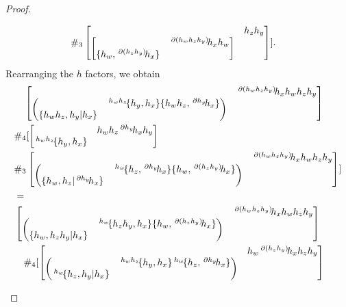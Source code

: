 \documentclass[11pt, reqno]{amsart} %
\newcommand{\act}[1]{\,\sp{#1}\!}
\theoremstyle{definition}
\theoremstyle{remark}
\numberwithin{equation}{section}
\begin{document}
\begin{proof}
\begin{enumerate}
\begin{align*}
      & \#_3
      \begin{bmatrix}& h_zh_y\\ \begin{bmatrix} & \act{\partial (h_wh_zh_y)}h_xh_w\\ \{h_w,\act{\partial (h_zh_y)}h_x\} &\end{bmatrix}&\end{bmatrix}
    ].
  \end{align*}
  Rearranging the $h$ factors, we obtain
  \begin{align*}
    &\quad 
    \begin{bmatrix}& \act{\partial(h_wh_zh_y)}h_xh_wh_zh_y\\ \begin{pmatrix}& \act{h_wh_z}\{h_y,h_x\}\{h_wh_z,\act{\partial h_y}h_x\}\\ \{h_wh_z,h_y|h_x\}& \end{pmatrix}& \end{bmatrix}
    \\
    & \#_4
    [
      \begin{bmatrix}& h_wh_z\act{\partial h_y}h_xh_y\\ \act{h_wh_z}\{h_y,h_x\}&\end{bmatrix} \\
      & 
      \#_3
      \begin{bmatrix}& \act{\partial(h_wh_zh_y)}h_xh_wh_zh_y\\\begin{pmatrix} & \act{h_w}\{h_z,\act{\partial h_y}h_x\}\{h_w,\act{\partial (h_zh_y)}h_x\}\\ \{h_w,h_z|\act{\partial h_y}h_x\}&\end{pmatrix} &\end{bmatrix}
    ] \\
    &= \\
    &
    \begin{bmatrix}& \act{\partial (h_wh_zh_y)}h_xh_wh_zh_y\\ \begin{pmatrix} & \act{h_w}\{h_zh_y,h_x\}\{h_w,\act{\partial(h_zh_y)}h_x\}\\\{h_w,h_zh_y|h_x\} &\end{pmatrix} &\end{bmatrix} \\
    &\quad \#_4
    [
      \begin{bmatrix}& h_w\act{\partial (h_zh_y)}h_xh_zh_y\\ \begin{pmatrix}& \act{h_wh_z}\{h_y,h_x\}\act{h_w}\{h_z,\act{\partial h_y}h_x\}\\ \act{h_w}\{h_z,h_y|h_x\} &\end{pmatrix}& \end{bmatrix} \\

\end{align*}
\end{enumerate}
\end{proof}
\end{document}
